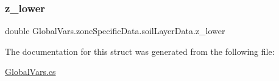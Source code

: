 \mbox{\label{struct_global_vars_1_1zone_specific_data_1_1soil_layer_data_a92d37767e9dfbc2853580e82bf9a79ef}} 
\subsubsection{\texorpdfstring{z\_lower}{z\_lower}}
{\footnotesize\ttfamily double Global\+Vars.\+zone\+Specific\+Data.\+soil\+Layer\+Data.\+z\+\_\+lower}



The documentation for this struct was generated from the following file\+:\begin{DoxyCompactItemize}
\item 
\mbox{\hyperlink{_global_vars_8cs}{Global\+Vars.\+cs}}\end{DoxyCompactItemize}
